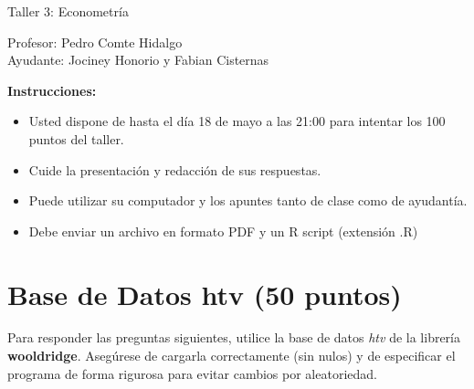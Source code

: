 \documentclass[letterpaper,11pt]{article}
\begin{document}
\begin{center}
    {\Large  Taller 3: Econometría }

Profesor:    Pedro Comte Hidalgo\\
Ayudante: Jociney Honorio y Fabian Cisternas
\end{center}

\textbf{Instrucciones:} 

\begin{itemize}
    \item Usted dispone de hasta el día 18 de mayo a las 21:00  para intentar los 100 puntos del taller.
    \item Cuide la presentación y redacción de sus respuestas.
    \item Puede utilizar su computador y los apuntes tanto de clase como de ayudantía.
    \item Debe enviar un archivo en formato PDF y un R script (extensión .R)
\end{itemize}

\section{Base de Datos htv (50 puntos)}

Para responder las preguntas siguientes, utilice la base de datos \textit{htv} de la librería \textbf{wooldridge}. Asegúrese de cargarla correctamente (sin nulos) y de especificar el programa de forma rigurosa para evitar cambios por aleatoriedad.
\end{document}
